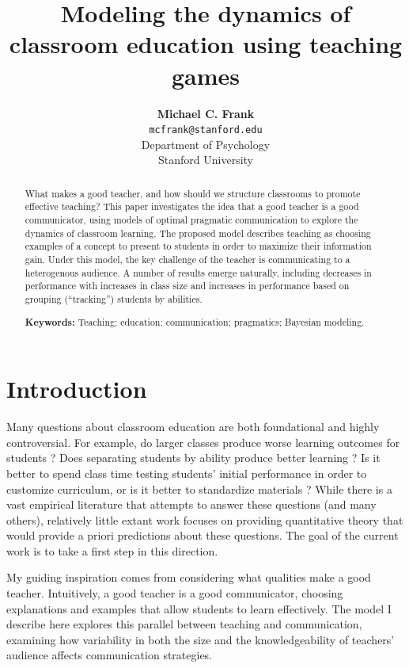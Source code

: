 \documentclass[10pt,letterpaper]{article}
\title{Modeling the dynamics of classroom education using teaching games}
\author{{\large \bf Michael C. Frank} \\
  \texttt{mcfrank@stanford.edu} \\
  Department of Psychology\\
  Stanford University}
\begin{document}
\maketitle

\begin{abstract}
What makes a good teacher, and how should we structure classrooms to promote effective teaching? This paper investigates the idea that a good teacher is a good communicator, using models of optimal pragmatic communication to explore the dynamics of classroom learning. The proposed model describes teaching as choosing examples of a concept to present to students in order to maximize their information gain. Under this model, the key challenge of the teacher is communicating to a heterogenous audience. A number of results emerge naturally, including decreases in performance with increases in class size and increases in performance based on grouping (``tracking'') students by abilities.

\textbf{Keywords:} 
Teaching; education; communication; pragmatics; Bayesian modeling.
\end{abstract}

\section{Introduction}

Many questions about classroom education are both foundational and highly controversial. For example, do larger classes produce worse learning outcomes for students \cite{glass1979,slavin1989}? Does separating students by ability produce better learning \cite{slavin1987}? Is it better to spend class time testing students' initial performance in order to customize curriculum, or is it better to standardize materials \cite{fuchs1986}? While there is a vast empirical literature that attempts to answer these questions (and many others), relatively little extant work focuses on providing quantitative theory that would provide a priori predictions about these questions. The goal of the current work is to take a first step in this direction.

My guiding inspiration comes from considering what qualities make a good teacher. Intuitively, a good teacher is a good communicator, choosing explanations and examples that allow students to learn effectively. The model I describe here explores this parallel between teaching and communication, examining how variability in both the size and the knowledgeability of teachers' audience affects communication strategies. 
\end{document}
